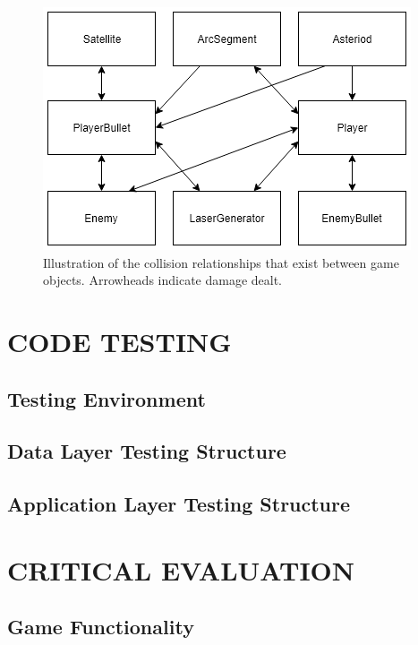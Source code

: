 \documentclass[10pt,twocolumn]{witseiepaper}
\begin{document}
\begin{figure}[h]
	\centering
	\includegraphics[width=0.9\columnwidth]{collisions.png}
	\caption{Illustration of the collision relationships that exist between game objects. Arrowheads indicate damage dealt.}
	\raggedright
	\label{fig:collisions}
\end{figure}



\section{CODE TESTING}

\subsection{Testing Environment}

\subsection{Data Layer Testing Structure}

\subsection{Application Layer Testing Structure}

\section{CRITICAL EVALUATION}

\subsection{Game Functionality}
\end{document}
